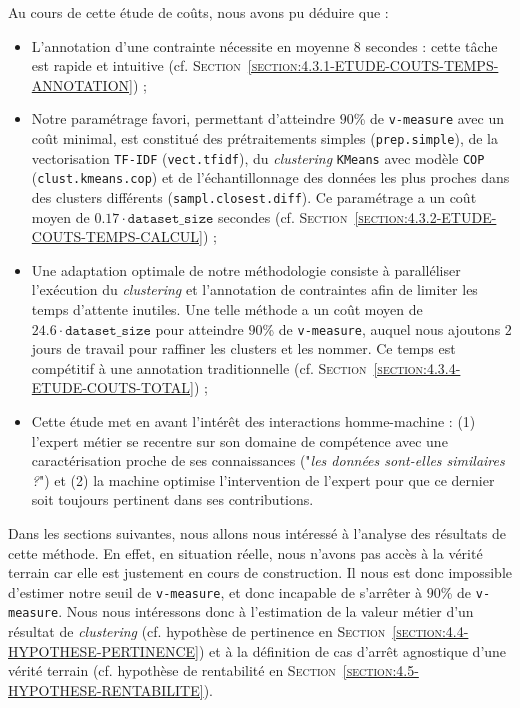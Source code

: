 			\begin{leftBarSummary}
				Au cours de cette étude de coûts, nous avons pu déduire que :
				\begin{itemize}
					\item[\itemok] L'annotation d'une contrainte nécessite en moyenne $8$ secondes : cette tâche est rapide et intuitive (cf. \textsc{Section~\ref{section:4.3.1-ETUDE-COUTS-TEMPS-ANNOTATION}}) ;
					\item[\itemok] Notre paramétrage favori, permettant d'atteindre $90$\% de \texttt{v-measure} avec un coût minimal, est constitué des prétraitements simples (\texttt{prep.simple}), de la vectorisation \texttt{TF-IDF} (\texttt{vect.tfidf}), du \textit{clustering} \texttt{KMeans} avec modèle \texttt{COP} (\texttt{clust.kmeans.cop}) et de l'échantillonnage des données les plus proches dans des clusters différents (\texttt{sampl.closest.diff}). Ce paramétrage a un coût moyen de $0.17 \cdot \texttt{dataset\_size}$ secondes (cf. \textsc{Section~\ref{section:4.3.2-ETUDE-COUTS-TEMPS-CALCUL}}) ;
					\item[\itemok] Une adaptation optimale de notre méthodologie consiste à paralléliser l'exécution du \textit{clustering} et l'annotation de contraintes afin de limiter les temps d'attente inutiles. Une telle méthode a un coût moyen de $24.6 \cdot \texttt{dataset\_size}$ pour atteindre $90$\% de \texttt{v-measure}, auquel nous ajoutons $2$ jours de travail pour raffiner les clusters et les nommer. Ce temps est compétitif à une annotation traditionnelle (cf. \textsc{Section~\ref{section:4.3.4-ETUDE-COUTS-TOTAL}}) ;
					\item[\itemok] Cette étude met en avant l'intérêt des interactions homme-machine : (1) l'expert métier se recentre sur son domaine de compétence avec une caractérisation proche de ses connaissances ("\textit{les données sont-elles similaires ?}") et (2) la machine optimise l'intervention de l'expert pour que ce dernier soit toujours pertinent dans ses contributions.
				\end{itemize}
			\end{leftBarSummary}
		
		Dans les sections suivantes, nous allons nous intéressé à l'analyse des résultats de cette méthode.
		En effet, en situation réelle, nous n'avons pas accès à la vérité terrain car elle est justement en cours de construction.
		Il nous est donc impossible d'estimer notre seuil de \texttt{v-measure}, et donc incapable de s'arrêter à $90$\% de \texttt{v-measure}.
		Nous nous intéressons donc à l'estimation de la valeur métier d'un résultat de \textit{clustering} (cf. hypothèse de pertinence en \textsc{Section~\ref{section:4.4-HYPOTHESE-PERTINENCE}}) et à la définition de cas d'arrêt agnostique d'une vérité terrain (cf. hypothèse de rentabilité en \textsc{Section~\ref{section:4.5-HYPOTHESE-RENTABILITE}}).